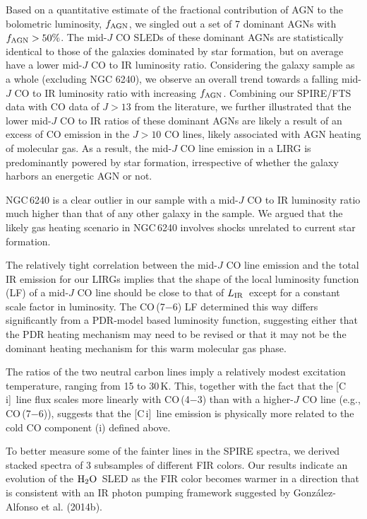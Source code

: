 \documentclass[preprint]{aastex}
\newcommand{\Water}{\mbox{${\rm H}_2{\rm O}$}}
\newcommand{\CI}{[C\,{\sc i}]}
\newcommand{\LIR}{\mbox{$L_{\rm IR}$}}
\begin{document}
Based on a quantitative estimate of the fractional contribution of AGN
to the bolometric luminosity, $f_{\rm AGN}$, we singled out a set of 7 dominant 
AGNs with $f_{\rm AGN} > 50\%$.  The mid-$J$ CO SLEDs of these dominant AGNs
are statistically identical to those of the galaxies dominated by star formation, 
but on average have a lower mid-$J$ CO to IR luminosity ratio.  
Considering the galaxy sample as a whole (excluding NGC 6240),  we observe an 
overall trend towards a falling mid-$J$ CO to IR luminosity ratio with increasing
$f_{\rm AGN}$.  Combining our SPIRE/FTS data with CO data of $J > 13$ from 
the literature, we further illustrated that the lower mid-$J$ CO to IR ratios of 
these dominant AGNs are likely a result of an excess of CO emission in 
the $J > 10$ CO lines,  likely associated with AGN heating of molecular gas. 
As a result, the mid-$J$ CO line emission in a LIRG is predominantly powered 
by star formation, irrespective of whether the galaxy harbors an energetic AGN 
or not. 


NGC\,6240 is a clear outlier in our sample with a mid-$J$ CO to IR luminosity
ratio much higher than that of any other galaxy in the sample.  We argued that 
the likely gas heating scenario in NGC\,6240 involves shocks unrelated to 
current star formation.


The relatively tight correlation between the mid-$J$ CO line emission and 
the total IR emission for our LIRGs implies that the shape of the local 
luminosity function (LF) of a mid-$J$ CO line should be close to that of 
\LIR\ except for a constant scale factor in luminosity.  The CO\,(7$-$6) LF
determined this way differs significantly from a PDR-model based luminosity
function, suggesting either that the PDR heating mechanism may need to be 
revised or that it may not be the dominant heating mechanism for this warm 
molecular gas phase.


The ratios of the two neutral carbon lines imply a relatively modest 
excitation temperature, ranging from 15 to 30\,K.  This, together with the fact 
that the \CI\ line flux scales more linearly with CO\,(4$-$3) than 
with a higher-$J$ CO line (e.g., CO\,(7$-$6)), suggests that the \CI\ line 
emission is physically more related to the cold CO component (i) defined 
above.    


To better measure some of the fainter lines in the SPIRE spectra, we 
derived stacked spectra of 3 subsamples of different FIR colors.  Our 
results indicate an evolution of the \Water\ SLED as the FIR color 
becomes warmer in a direction that is consistent with an IR photon pumping 
framework suggested by Gonz\'alez-Alfonso et al. (2014b).  
\end{document}
